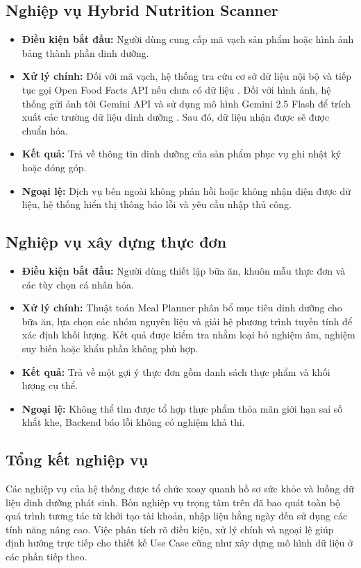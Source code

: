 \documentclass[12pt, a4paper]{report}
\begin{document}
\subsection{Nghiệp vụ Hybrid Nutrition Scanner}
\begin{itemize}
    \item \textbf{Điều kiện bắt đầu:} Người dùng cung cấp mã vạch sản phẩm hoặc hình ảnh bảng thành phần dinh dưỡng.
    \item \textbf{Xử lý chính:} Đối với mã vạch, hệ thống tra cứu cơ sở dữ liệu nội bộ và tiếp tục gọi Open Food Facts API nếu chưa có dữ liệu \cite{offApiCheatSheet}. Đối với hình ảnh, hệ thống gửi ảnh tới Gemini API và sử dụng mô hình Gemini 2.5 Flash để trích xuất các trường dữ liệu dinh dưỡng \cite{googleGemini25Flash}. Sau đó, dữ liệu nhận được sẽ được chuẩn hóa.
    \item \textbf{Kết quả:} Trả về thông tin dinh dưỡng của sản phẩm phục vụ ghi nhật ký hoặc đóng góp.
    \item \textbf{Ngoại lệ:} Dịch vụ bên ngoài không phản hồi hoặc không nhận diện được dữ liệu, hệ thống hiển thị thông báo lỗi và yêu cầu nhập thủ công.
\end{itemize}

\subsection{Nghiệp vụ xây dựng thực đơn}
\begin{itemize}
    \item \textbf{Điều kiện bắt đầu:} Người dùng thiết lập bữa ăn, khuôn mẫu thực đơn và các tùy chọn cá nhân hóa.
    \item \textbf{Xử lý chính:} Thuật toán Meal Planner phân bổ mục tiêu dinh dưỡng cho bữa ăn, lựa chọn các nhóm nguyên liệu và giải hệ phương trình tuyến tính để xác định khối lượng. Kết quả được kiểm tra nhằm loại bỏ nghiệm âm, nghiệm suy biến hoặc khẩu phần không phù hợp.
    \item \textbf{Kết quả:} Trả về một gợi ý thực đơn gồm danh sách thực phẩm và khối lượng cụ thể.
    \item \textbf{Ngoại lệ:} Không thể tìm được tổ hợp thực phẩm thỏa mãn giới hạn sai số khắt khe, Backend báo lỗi không có nghiệm khả thi.
\end{itemize}

\subsection{Tổng kết nghiệp vụ}
Các nghiệp vụ của hệ thống được tổ chức xoay quanh hồ sơ sức khỏe và luồng dữ liệu dinh dưỡng phát sinh. Bốn nghiệp vụ trọng tâm trên đã bao quát toàn bộ quá trình tương tác từ khởi tạo tài khoản, nhập liệu hằng ngày đến sử dụng các tính năng nâng cao. Việc phân tích rõ điều kiện, xử lý chính và ngoại lệ giúp định hướng trực tiếp cho thiết kế Use Case cũng như xây dựng mô hình dữ liệu ở các phần tiếp theo.
\end{document}
